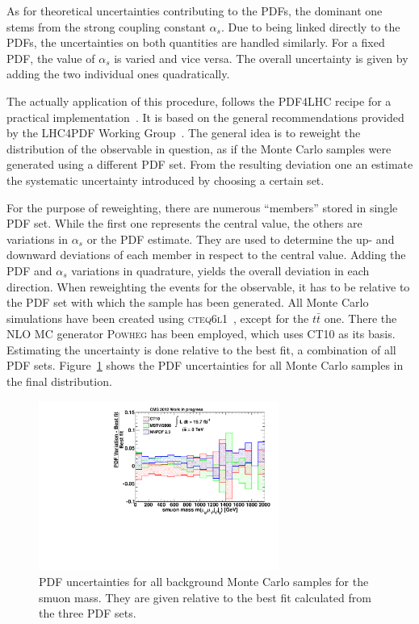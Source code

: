 As for theoretical uncertainties contributing to the PDFs, the dominant one stems from the strong coupling constant $\alpha_s$. Due to being linked directly to the PDFs, the uncertainties on both quantities are handled similarly. For a fixed PDF, the value of $\alpha_s$ is varied and vice versa. The overall uncertainty is given by adding the two individual ones quadratically.

The actually application of this procedure, follows the \textsc{PDF4LHC} recipe for a practical implementation~\cite{pdf4lhcpractical}. It is based on the general recommendations provided by the LHC4PDF Working Group~\cite{pdf4lhcrecom}. The general idea is to reweight the distribution of the observable in question, as if the Monte Carlo samples were generated using a different PDF set. From the resulting deviation one an estimate the systematic uncertainty introduced by choosing a certain set.

For the purpose of reweighting, there are numerous ``members'' stored in single PDF set. While the first one represents the central value, the others are variations in $\alpha_s$ or the PDF estimate. They are used to determine the up- and downward deviations of each member in respect to the central value. Adding the PDF and $\alpha_s$ variations in quadrature, yields the overall deviation in each direction. When reweighting the events for the observable, it has to be relative to the PDF set with which the sample has been generated. All Monte Carlo simulations have been created using \textsc{cteq6l1}~\cite{cteq6l1}, except for the $t\bar{t}$ one. There the NLO MC generator \textsc{Powheg} has been employed, which uses \textsc{CT10} as its basis. Estimating the uncertainty is done relative to the best fit, a combination of all PDF sets. Figure~\ref{fig:pdfsys} shows the PDF uncertainties for all Monte Carlo samples in the final distribution.

\begin{figure}[!htb]
  \centering
  \includegraphics[width=0.7\textwidth]{plots/pdfratios.pdf}
  \caption{PDF uncertainties for all background Monte Carlo samples for the smuon mass. They are given relative to the best fit calculated from the three PDF sets.}
  \label{fig:pdfsys}
\end{figure}

